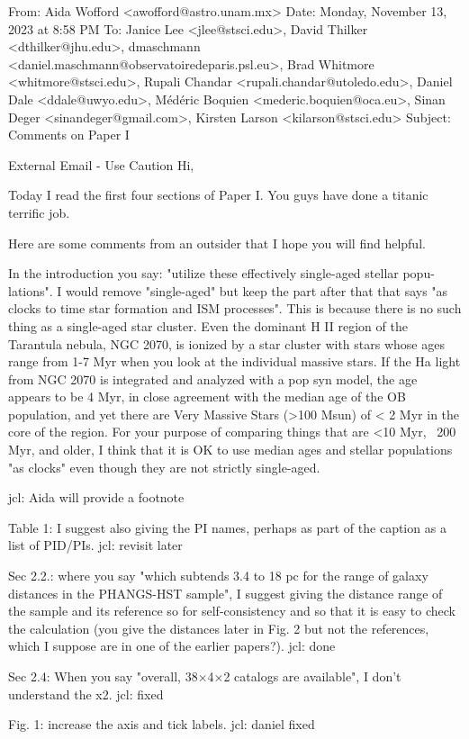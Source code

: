 
From: Aida Wofford <awofford@astro.unam.mx>
Date: Monday, November 13, 2023 at 8:58 PM
To: Janice Lee <jlee@stsci.edu>, David Thilker <dthilker@jhu.edu>, dmaschmann <daniel.maschmann@observatoiredeparis.psl.eu>, Brad Whitmore <whitmore@stsci.edu>, Rupali Chandar <rupali.chandar@utoledo.edu>, Daniel Dale <ddale@uwyo.edu>, Médéric Boquien <mederic.boquien@oca.eu>, Sinan Deger <sinandeger@gmail.com>, Kirsten Larson <kilarson@stsci.edu>
Subject: Comments on Paper I

External Email - Use Caution
Hi,

Today I read the first four sections of Paper I. You guys have done a titanic terrific job.

Here are some comments from an outsider that I hope you will find helpful. 

In the introduction you say: "utilize these effectively single-aged stellar popu-
lations". I would remove "single-aged" but keep the part after that that says "as clocks to time star formation and ISM processes".  This is because  there is no such thing as a single-aged star cluster. Even the dominant H II region of the Tarantula nebula, NGC 2070, is ionized by a star cluster with stars whose ages range from 1-7 Myr when you look at the individual massive stars. If the Ha light from NGC 2070 is integrated and analyzed with a pop syn model, the age appears to be 4 Myr, in close agreement with the median age of the OB population, and yet there are Very Massive Stars (>100 Msun) of < 2 Myr in the core of the region. For your purpose of comparing things that are <10 Myr, ~200 Myr, and older, I think that it is OK to use median ages and stellar populations "as clocks" even though they are not strictly single-aged.

jcl: Aida will provide a footnote

Table 1: I suggest also giving the PI names, perhaps as part of the caption as a list of PID/PIs.
jcl: revisit later


Sec 2.2.: where you say "which subtends 3.4 to 18 pc for the range of galaxy distances in the PHANGS-HST sample", I suggest giving the distance range of the sample and its reference so for self-consistency and so that it is easy to check the calculation (you give the distances later in Fig. 2 but not the references, which I suppose are in one of the earlier papers?). 
jcl: done


Sec 2.4: When you say "overall, 38×4×2 catalogs are available", I don't understand the x2.
jcl: fixed


Fig. 1: increase the axis and tick labels.
jcl: daniel fixed


